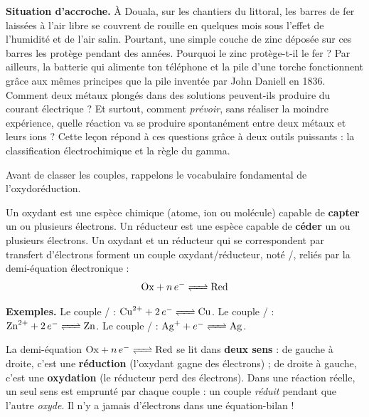 \documentclass[11pt]{article}
\newcommand{\cle}[1]{{\popxbold\color{popdark}#1}}
\newcounter{popsec}
\newcounter{popsub}
\newcommand{\courssub}[1]{%
  \stepcounter{popsub}%
  \par\vspace{9pt}\noindent{\popxbold\fontsize{11.5}{13}\selectfont\color{popink}{\color{poporange}\thepopsec.\thepopsub}\hspace{6pt}#1}\par\nopagebreak\vspace{4pt}
}
\begin{document}
\textbf{Situation d'accroche.} À Douala, sur les chantiers du littoral, les barres de fer laissées à l'air libre se couvrent de rouille en quelques mois sous l'effet de l'humidité et de l'air salin. Pourtant, une simple couche de zinc déposée sur ces barres les protège pendant des années. Pourquoi le zinc protège-t-il le fer ? Par ailleurs, la batterie qui alimente ton téléphone et la pile d'une torche fonctionnent grâce aux mêmes principes que la pile inventée par John Daniell en 1836. Comment deux métaux plongés dans des solutions peuvent-ils produire du courant électrique ? Et surtout, comment \emph{prévoir}, sans réaliser la moindre expérience, quelle réaction va se produire spontanément entre deux métaux et leurs ions ? Cette leçon répond à ces questions grâce à deux outils puissants : la \cle{classification électrochimique} et la \cle{règle du gamma}.

\courssub{Rappels : couples oxydant/réducteur}

Avant de classer les couples, rappelons le vocabulaire fondamental de l'oxydoréduction.

\begin{definition}
Un \cle{oxydant} est une espèce chimique (atome, ion ou molécule) capable de \textbf{capter} un ou plusieurs électrons. Un \cle{réducteur} est une espèce capable de \textbf{céder} un ou plusieurs électrons. Un oxydant  et un réducteur  qui se correspondent par transfert d'électrons forment un \cle{couple oxydant/réducteur}, noté /, reliés par la demi-équation électronique :
\[ \ce{Ox} + n\,e^- \ce{<=>} \ce{Red} \]
\end{definition}

\textbf{Exemples.} Le couple / : $\ce{Cu^2+} + 2\,e^- \ce{<=>} \ce{Cu}$. Le couple / : $\ce{Zn^2+} + 2\,e^- \ce{<=>} \ce{Zn}$. Le couple / : $\ce{Ag+} + e^- \ce{<=>} \ce{Ag}$.

\begin{attention}
La demi-équation $\ce{Ox} + n\,e^- \ce{<=>} \ce{Red}$ se lit dans \textbf{deux sens} : de gauche à droite, c'est une \textbf{réduction} (l'oxydant gagne des électrons) ; de droite à gauche, c'est une \textbf{oxydation} (le réducteur perd des électrons). Dans une réaction réelle, un seul sens est emprunté par chaque couple : un couple \emph{réduit} pendant que l'autre \emph{oxyde}. Il n'y a jamais d'électrons dans une équation-bilan !
\end{attention}
\end{document}
